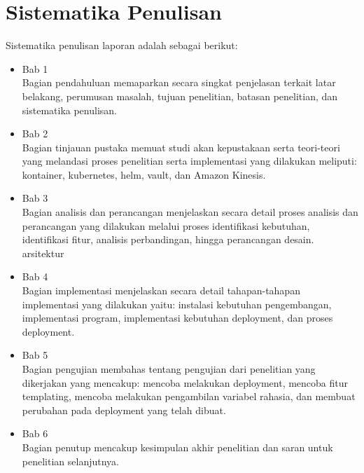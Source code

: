 \section{Sistematika Penulisan}
\label{sec:sistematikaPenulisan}
Sistematika penulisan laporan adalah sebagai berikut:
\begin{itemize}
	\item Bab 1 \babSatu \\
	    Bagian pendahuluan memaparkan secara singkat penjelasan terkait latar belakang, perumusan masalah, tujuan penelitian, batasan penelitian, dan sistematika penulisan.
	\item Bab 2 \babDua \\
	    Bagian tinjauan pustaka memuat studi akan kepustakaan serta teori-teori yang melandasi proses penelitian serta implementasi yang dilakukan meliputi: kontainer, kubernetes, helm, vault, dan Amazon Kinesis.
	\item Bab 3 \babTiga \\
	    Bagian analisis dan perancangan menjelaskan secara detail proses analisis dan perancangan yang dilakukan melalui proses identifikasi kebutuhan, identifikasi fitur, analisis perbandingan, hingga perancangan desain.
arsitektur
	\item Bab 4 \babEmpat \\
		Bagian implementasi menjelaskan secara detail tahapan-tahapan implementasi yang dilakukan yaitu: instalasi kebutuhan pengembangan, implementasi program, implementasi kebutuhan deployment, dan proses deployment.
	\item Bab 5 \babLima \\
	    Bagian pengujian membahas tentang pengujian dari penelitian yang dikerjakan yang mencakup: mencoba melakukan deployment, mencoba fitur templating, mencoba melakukan pengambilan variabel rahasia, dan membuat perubahan pada deployment yang telah dibuat.
	\item Bab 6 \kesimpulan \\
	    Bagian penutup mencakup kesimpulan akhir penelitian dan saran untuk penelitian selanjutnya.
\end{itemize}
